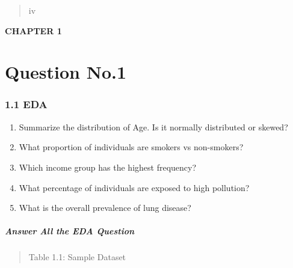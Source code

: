 \begin{quote}
iv
\end{quote}

\textbf{CHAPTER 1}

\section{Question No.1}\label{question-no.1}

\subsubsection{1.1 EDA}\label{eda}

\begin{enumerate}
\def\labelenumi{\arabic{enumi}.}
\item
  Summarize the distribution of Age. Is it normally distributed or
  skewed?
\item
  What proportion of individuals are smokers vs non-smokers?
\item
  Which income group has the highest frequency?
\item
  What percentage of individuals are exposed to high pollution?
\item
  What is the overall prevalence of lung disease?
\end{enumerate}

\subparagraph{Answer All the EDA
Question}\label{answer-all-the-eda-question}

\begin{quote}
Table 1.1: Sample Dataset
\end{quote}

